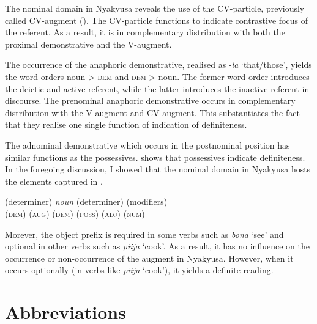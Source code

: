 \documentclass[output=paper]{langscibook}
\begin{document}
The nominal domain in Nyakyusa reveals the use of the CV-particle, previously called CV-aug\-ment (\citealt{DeBlois1970, Mbope2016, Persohn2017}). The CV-particle functions to indicate contrastive focus of the referent. As a result, it is in complementary distribution with both the proximal demonstrative and the V-aug\-ment. 

\begin{sloppypar}
The occurrence of the anaphoric demonstrative, realised as -\textit{la} ‘that/those’, yields the word orders noun > \textsc{dem} and \textsc{dem} > noun. The former word order introduces the deictic and active referent, while the latter introduces the inactive referent in discourse. The prenominal anaphoric demonstrative occurs in complementary distribution with the V-aug\-ment and CV-aug\-ment. This substantiates the fact that they realise one single function of indication of definiteness. 
\end{sloppypar}

The adnominal demonstrative which occurs in the postnominal position has similar functions as the possessives. \citet{Lyons1999} shows that possessives indicate definiteness. In the foregoing discussion, I showed that the nominal domain in Nyakyusa hosts the elements captured in . 

\ea\label{ex:lusekelo:65}
\gll (determiner)  \textit{noun}  (determiner)  (modifiers)\\
  {(\textsc{dem}) (\textsc{aug})}   {} {(\textsc{dem}) (\textsc{poss})}  {(\textsc{adj}) (\textsc{num})}\\
\z

Morever, the object prefix is required in some verbs such as \textit{bona} ‘see’ and optional in other verbs such as \textit{piija} ‘cook’. As a result, it has no influence on the occurrence or non-occurrence of the augment in Nyakyusa. However, when it occurs optionally (in verbs like \textit{piija} ‘cook’), it yields a definite reading. 

\section*{Abbreviations}
\end{document}
